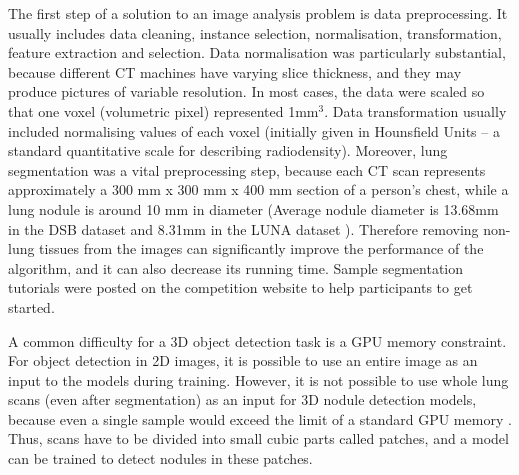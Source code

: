\documentclass[12pt]{article}
\begin{document}
The first step of a solution to an image analysis problem is data preprocessing. It usually includes data cleaning, instance selection, normalisation, transformation, feature extraction and selection. Data normalisation was particularly substantial, because different CT machines have varying slice thickness, and they may produce pictures of variable resolution. In most cases, the data were scaled so that one voxel (volumetric pixel) represented 1mm$^3$. Data transformation usually included normalising values of each voxel (initially given in Hounsfield Units \--- a standard quantitative scale for describing radiodensity). Moreover, lung segmentation was a vital preprocessing step, because each CT scan represents approximately a 300 mm x 300 mm x 400 mm section of a person's chest, while a lung nodule is around 10 mm in diameter (Average nodule diameter is 13.68mm in the DSB dataset and 8.31mm in the LUNA dataset \citep{liao2017evaluate}). Therefore removing non-lung tissues from the images can significantly improve the performance of the algorithm, and it can also decrease its running time. Sample segmentation tutorials were posted on the competition website to help participants to get started.

A common difficulty for a 3D object detection task is a GPU memory constraint. For object detection in 2D images, it is possible to use an entire image as an input to the models during training. However, it is not possible to use whole lung scans (even after segmentation) as an input for 3D nodule detection models, because even a single sample would exceed the limit of a standard GPU memory  \citep{liao2017evaluate}. Thus, scans have to be divided into small cubic parts called patches, and a model can be trained to detect nodules in these patches.
\end{document}
